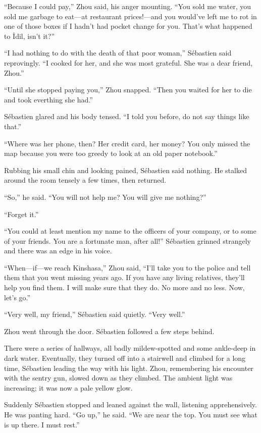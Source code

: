 \documentclass[10pt,b5paper]{article}
\begin{document}
``Because I could pay,'' Zhou said, his anger mounting. ``You sold
me water, you sold me garbage to eat---at restaurant prices!---and
you would've left me to rot in one of those boxes if I hadn't had
pocket change for you. That's what happened to \.{I}dil, isn't it?''

``I had nothing to do with the death of that poor woman,'' S\'{e}bastien
said reprovingly. ``I cooked for her, and she was most grateful. She
was a dear friend, Zhou.''

``Until she stopped paying you,'' Zhou snapped. ``Then you waited for
her to die and took everthing she had.''

S\'{e}bastien glared and his body tensed. ``I told you before, do not
say things like that.''

``Where was her phone, then? Her credit card, her money? You only
missed the map because you were too greedy to look at an old paper
notebook.''

Rubbing his small chin and looking pained, S\'{e}bastien said nothing.
He stalked around the room tensely a few times, then returned.

``So,'' he said. ``You will not help me? You will give me nothing?''

``Forget it.''

``You could at least mention my name to the officers of your company,
or to some of your friends. You are a fortunate man, after all!''
S\'{e}bastien grinned strangely and there was an edge in his voice.

``When---if---we reach Kinshasa,'' Zhou said, ``I'll take you to the
police and tell them that you went missing years ago. If you have
any living relatives, they'll help you find them. I will make sure
that they do. No more and no less. Now, let's go.''

``Very well, my friend,'' S\'{e}bastien said quietly. ``Very well.''

Zhou went through the door. S\'{e}bastien followed a few steps behind.

There were a series of hallways, all badly mildew-spotted and
some ankle-deep in dark water. Eventually, they turned off into a
stairwell and climbed for a long time, S\'{e}bastien leading the way
with his light. Zhou, remembering his encounter with the sentry
gun, slowed down as they climbed. The ambient light was increasing;
it was now a pale yellow glow.

Suddenly S\'{e}bastien stopped and leaned against the wall, listening
apprehensively. He was panting hard. ``Go up,'' he said. ``We are near
the top. You must see what is up there. I must rest.''
\end{document}
